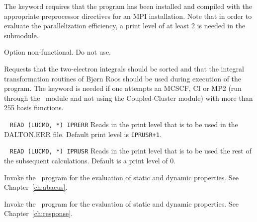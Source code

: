 \begin{description}
The keyword requires that the program has been installed and compiled
with the appropriate preprocessor directives for an MPI
installation.
Note that
in order to evaluate the parallelization efficiency, a print level of
at least 2 is needed in the  submodule.

\item[\Key{PARNMD}] Option non-functional. Do not use.

\item[\Key{PRESORT}] Requests that the
two-electron integrals should be
sorted and that the integral transformation routines of Bj\o rn
Roos should be used during execution of the program. The keyword is needed if one attempts an MCSCF, CI or MP2 (run through the \sir\ module and not using the Coupled-Cluster module) with more than 255 basis functions.

\item[\Key{PRIERR}]\verb| |\newline
\verb|READ (LUCMD, *) IPRERR|
Reads in the print level that is to be used in the DALTON.ERR
file. Default print level is \verb|IPRUSR+1|.

\item[\Key{PRINT}]\verb| |\newline
\verb|READ (LUCMD, *) IPRUSR|
Reads in the print level that is to be used the rest of the subsequent
calculations. Default is a print level of 0.

\item[\Key{PROPERTIES}] Invoke the \aba\ program for the evaluation of static
and dynamic properties. See Chapter~\ref{ch:abacus}.

\item[\Key{RESPONSE}]

Invoke the \resp\ program for the evaluation of static and dynamic
properties. See Chapter~\ref{ch:response}.


\end{description}
